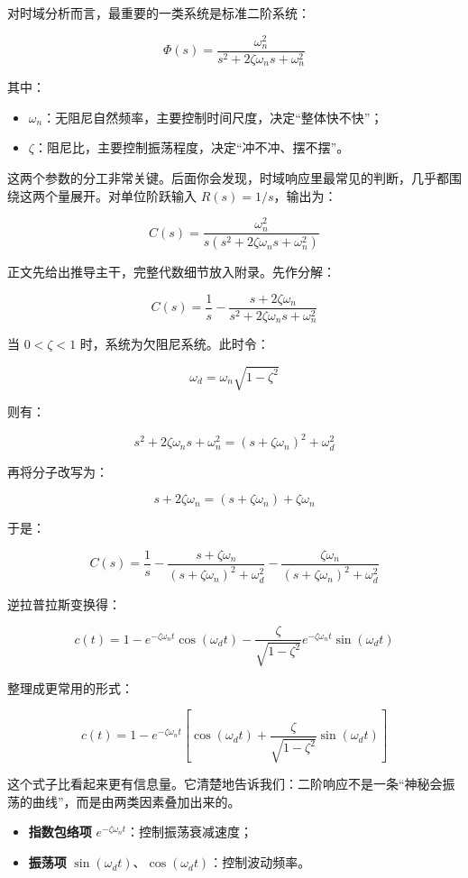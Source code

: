 \documentclass[
  11pt]{article}
\providecommand{\tightlist}{%
  \setlength{\itemsep}{0pt}\setlength{\parskip}{0pt}}
\begin{document}
对时域分析而言，最重要的一类系统是标准二阶系统：

\[
\Phi(s) = \frac{\omega_n^2}{s^2 + 2\zeta\omega_n s + \omega_n^2}
\]

其中：

\begin{itemize}
\tightlist
\item
  \(\omega_n\)：无阻尼自然频率，主要控制时间尺度，决定``整体快不快''；
\item
  \(\zeta\)：阻尼比，主要控制振荡程度，决定``冲不冲、摆不摆''。
\end{itemize}

这两个参数的分工非常关键。后面你会发现，时域响应里最常见的判断，几乎都围绕这两个量展开。对单位阶跃输入
\(R(s)=1/s\)，输出为：

\[
C(s) = \frac{\omega_n^2}{s\left(s^2 + 2\zeta\omega_n s + \omega_n^2\right)}
\]

正文先给出推导主干，完整代数细节放入附录。先作分解：

\[
C(s) = \frac{1}{s} - \frac{s + 2\zeta\omega_n}{s^2 + 2\zeta\omega_n s + \omega_n^2}
\]

当 \(0<\zeta<1\) 时，系统为欠阻尼系统。此时令：

\[
\omega_d = \omega_n\sqrt{1-\zeta^2}
\]

则有：

\[
s^2 + 2\zeta\omega_n s + \omega_n^2 = (s+\zeta\omega_n)^2 + \omega_d^2
\]

再将分子改写为：

\[
s + 2\zeta\omega_n = (s+\zeta\omega_n) + \zeta\omega_n
\]

于是：

\[
C(s) = \frac{1}{s} - \frac{s+\zeta\omega_n}{(s+\zeta\omega_n)^2+\omega_d^2} - \frac{\zeta\omega_n}{(s+\zeta\omega_n)^2+\omega_d^2}
\]

逆拉普拉斯变换得：

\[
c(t) = 1 - e^{-\zeta\omega_n t}\cos(\omega_d t) - \frac{\zeta}{\sqrt{1-\zeta^2}}e^{-\zeta\omega_n t}\sin(\omega_d t)
\]

整理成更常用的形式：

\[
c(t) = 1 - e^{-\zeta\omega_n t}\left[\cos(\omega_d t) + \frac{\zeta}{\sqrt{1-\zeta^2}}\sin(\omega_d t)\right]
\]

这个式子比看起来更有信息量。它清楚地告诉我们：二阶响应不是一条``神秘会振荡的曲线''，而是由两类因素叠加出来的。

\begin{itemize}
\tightlist
\item
  \textbf{指数包络项} \(e^{-\zeta\omega_n t}\)：控制振荡衰减速度；
\item
  \textbf{振荡项}
  \(\sin(\omega_d t)\)、\(\cos(\omega_d t)\)：控制波动频率。
\end{itemize}
\end{document}
